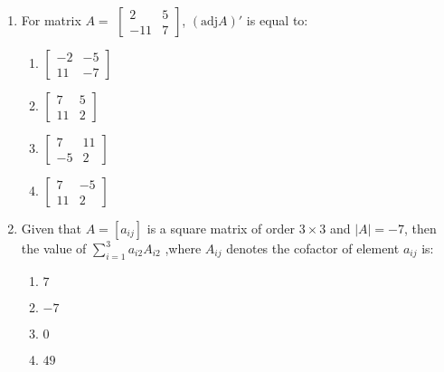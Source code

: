 \documentclass{article}
\begin{document}
\begin{enumerate}
    \item For matrix $A =$
    $\begin{bmatrix}
      2 & 5 \\
      -11 & 7
    \end{bmatrix}$,
    $(\text{adj}A)'$ is equal to:
    \begin{enumerate}
        \item $\begin{bmatrix}
        -2 & -5 \\ 11 & -7
        \end{bmatrix}$
        \item $\begin{bmatrix}
        7 & 5 \\ 11 & 2
        \end{bmatrix}$
        \item $\begin{bmatrix}
        7 & 11 \\ -5 & 2
        \end{bmatrix}$
        \item $\begin{bmatrix}
        7 & -5 \\ 11 & 2
        \end{bmatrix}$
    \end{enumerate}

    \item Given that $A = [a_{ij}]$ is a square matrix of order $3 \times 3$ and $|A| = -7$, then the value of  $\sum_{i=1}^{3} a_{i2}A_{i2} $ ,where $A_{ij}$ denotes the cofactor of element $a_{ij}$ is:
    \begin{enumerate}
        \item $7$
        \item $-7$
        \item $0$
        \item $49$
    \end{enumerate}
    

\end{enumerate}
\end{document}
